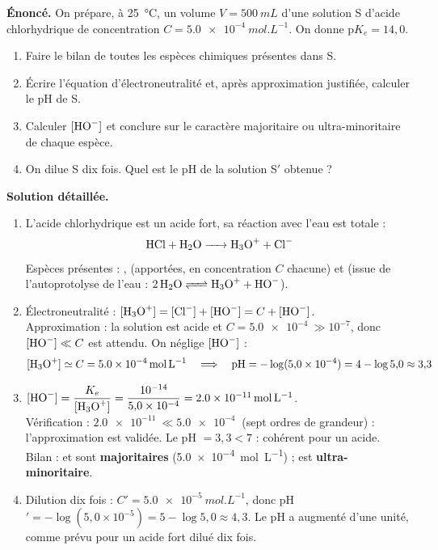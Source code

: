 \documentclass[11pt]{article}
\begin{document}
\begin{exoresolu}
\textbf{Énoncé.} On prépare, à \SI{25}{\celsius}, un volume $V = \SI{500}{mL}$ d'une solution S d'acide chlorhydrique de concentration $C = \SI{5,0e-4}{mol.L^{-1}}$. On donne $\text{p}K_e = 14{,}0$.
\begin{enumerate}
\item Faire le bilan de toutes les espèces chimiques présentes dans S.
\item Écrire l'équation d'électroneutralité et, après approximation justifiée, calculer le pH de S.
\item Calculer $[\ce{HO-}]$ et conclure sur le caractère majoritaire ou ultra-minoritaire de chaque espèce.
\item On dilue S dix fois. Quel est le pH de la solution S$'$ obtenue ?
\end{enumerate}
\tcblower
\textbf{Solution détaillée.}
\begin{enumerate}
\item L'acide chlorhydrique est un acide fort, sa réaction avec l'eau est totale :
\[ \ce{HCl + H2O -> H3O+ + Cl-} \]
Espèces présentes : ,  (apportées, en concentration $C$ chacune) et  (issue de l'autoprotolyse de l'eau : $\ce{2 H2O <=> H3O+ + HO-}$).
\item Électroneutralité : $[\ce{H3O+}] = [\ce{Cl-}] + [\ce{HO-}] = C + [\ce{HO-}]$.\\
Approximation : la solution est acide et $C = \SI{5,0e-4}{} \gg 10^{-7}$, donc $[\ce{HO-}] \ll C$ est attendu. On néglige $[\ce{HO-}]$ :
\[ [\ce{H3O+}] \simeq C = \SI{5,0e-4}{mol.L^{-1}} \quad\Longrightarrow\quad \text{pH} = -\log(5{,}0 \times 10^{-4}) = 4 - \log 5{,}0 \approx 3{,}3 \]
\item $[\ce{HO-}] = \dfrac{K_e}{[\ce{H3O+}]} = \dfrac{10^{-14}}{5{,}0 \times 10^{-4}} = \SI{2,0e-11}{mol.L^{-1}}$.\\
Vérification : $\SI{2,0e-11}{} \ll \SI{5,0e-4}{}$ (sept ordres de grandeur) : l'approximation est validée. Le pH $= 3{,}3 < 7$ : cohérent pour un acide.\\
Bilan :  et  sont \textbf{majoritaires} (\SI{5,0e-4}{mol.L^{-1}}) ;  est \textbf{ultra-minoritaire}.
\item Dilution dix fois : $C' = \SI{5,0e-5}{mol.L^{-1}}$, donc pH$' = -\log(5{,}0 \times 10^{-5}) = 5 - \log 5{,}0 \approx 4{,}3$. Le pH a augmenté d'une unité, comme prévu pour un acide fort dilué dix fois.
\end{enumerate}
\end{exoresolu}
\end{document}
